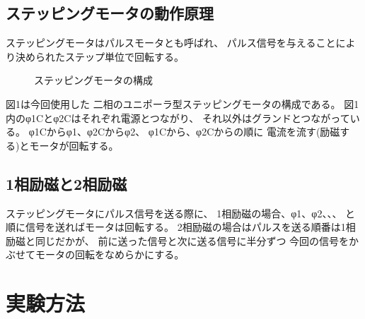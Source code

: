 \documentclass[10pt,a4paper]{jarticle}
\begin{document}
\subsection{ステッピングモータの動作原理}
ステッピングモータはパルスモータとも呼ばれ、
パルス信号を与えることにより決められたステップ単位で回転する。\par
\begin{figure}[hbtp]
 \centering
 \caption{ステッピングモータの構成}
 \label{fig:step}
\end{figure}
図1は今回使用した
二相のユニポーラ型ステッピングモータの構成である。
図1内のφ1Cとφ2Cはそれぞれ電源とつながり、
それ以外はグランドとつながっている。
φ1Cからφ1、φ2Cからφ2、
φ1Cから、φ2Cからの順に
電流を流す(励磁する)とモータが回転する。
\subsection{1相励磁と2相励磁}
ステッピングモータにパルス信号を送る際に、
1相励磁の場合、φ1、φ2、、、
と順に信号を送ればモータは回転する。
2相励磁の場合はパルスを送る順番は1相励磁と同じだかが、
前に送った信号と次に送る信号に半分ずつ
今回の信号をかぶせてモータの回転をなめらかにする。
\section{実験方法}
\end{document}
